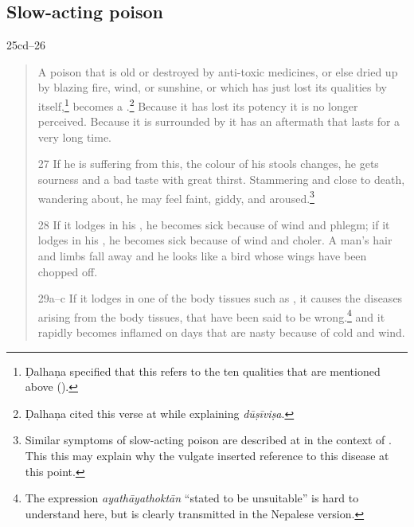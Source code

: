 \begin{translation}
    \subsection{Slow-acting poison}
    \item[25cd--26]  
    \begin{verse}
        A poison that is old or destroyed by
        anti-toxic medicines, or else dried up by blazing fire, wind, or sunshine, or
        which has just lost its qualities by itself,\footnote{Ḍalhaṇa specified that this 
        refers to the ten 
        qualities that are mentioned above ().} becomes a 
        .\footnote{Ḍalhaṇa cited this verse at 
         while explaining \emph{dūṣīviṣa}.}
                Because it has lost its potency it is
        no longer perceived.  Because it is surrounded by  it 
        has an aftermath that lasts for a very long time.
        
        \item[27] If he is suffering from this, the colour of his stools changes,
he gets sourness and a bad taste with great thirst. Stammering and close
to death, wandering about, he may feel faint, giddy, and
aroused.\footnote{Similar symptoms of slow-acting poison are described at
 in the context of  .  This this may explain why the vulgate inserted reference to this
disease at this point.}
        
        
        



        \item[28]
        If it lodges in his , he becomes sick because of wind 
        and phlegm; if it lodges in his , he becomes sick 
        because of  wind and 
        choler.  A man's hair and limbs fall away and he looks like a
        bird whose wings have been chopped off.
        \item[29a--c]
        If it lodges in one of the body tissues such as 
        , it causes the diseases arising
        from the body tissues, that have been said to be wrong.\footnote{The 
        expression \emph{ayathāyathoktān} “stated to be unsuitable” is hard to 
        understand here, but is clearly transmitted in the Nepalese version.}
        and it rapidly becomes inflamed on days that are nasty
        because of cold and wind.
        

\end{verse}
\end{translation}

